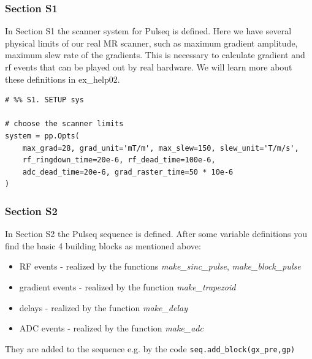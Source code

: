 \documentclass[a4paper,12pt]{extarticle}
\begin{document}
\subsubsection{Section S1}
In Section S1 the scanner system for Pulseq is defined.
Here we have several physical limits of our real MR scanner, such as maximum gradient amplitude, maximum slew rate of the gradients. This is necessary to calculate gradient and rf events that can be played out by real hardware. We will learn more about these definitions in ex\_help02.

\begin{verbatim}
# %% S1. SETUP sys

# choose the scanner limits
system = pp.Opts(
    max_grad=28, grad_unit='mT/m', max_slew=150, slew_unit='T/m/s',
    rf_ringdown_time=20e-6, rf_dead_time=100e-6,
    adc_dead_time=20e-6, grad_raster_time=50 * 10e-6
)

\end{verbatim}

\subsubsection{Section S2}
In Section S2 the Pulseq sequence is defined. After some variable definitions you find the basic 4 building blocks as mentioned above:
\begin{itemize}
\item RF events - realized by the functions \emph{make\_sinc\_pulse}, \emph{make\_block\_pulse}
\item gradient events - realized by the function \emph{make\_trapezoid}
\item delays - realized by the function \emph{make\_delay}
\item ADC events  - realized by the function \emph{make\_adc}
\end{itemize}

They are added to the sequence e.g. by the code \texttt{seq.add_block(gx_pre,gp)}
\end{document}
